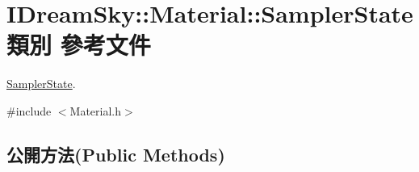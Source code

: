 \hypertarget{class_i_dream_sky_1_1_material_1_1_sampler_state}{}\section{I\+Dream\+Sky\+:\+:Material\+:\+:Sampler\+State 類別 參考文件}
\label{class_i_dream_sky_1_1_material_1_1_sampler_state}


\hyperlink{class_i_dream_sky_1_1_material_1_1_sampler_state}{Sampler\+State}.  




{\ttfamily \#include $<$Material.\+h$>$}

\subsection*{公開方法(Public Methods)}
